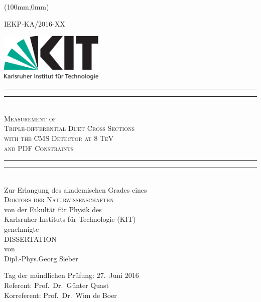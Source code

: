 \begin{titlepage}
    \begin{center}
        \begin{textblock*}{5cm}(100mm,0mm)
            \begin{flushright}
                \small
                IEKP-KA/2016-XX
            \end{flushright}
        \end{textblock*}
        \includegraphics[width=5.0cm]{figures/Kitlogo_de_cmyk}
        \vspace*{2cm}

        \vspace*{\baselineskip}
        \rule{\textwidth}{1.6pt}\vspace*{-\baselineskip}\vspace*{2pt}
        \rule{\textwidth}{0.4pt}\\[\baselineskip]
        \LARGE{\textsc{Measurement of\\
            Triple-differential Dijet Cross Sections\\
            with the CMS Detector at 8 TeV\\
            and PDF Constraints}}\\
        \rule{\textwidth}{0.4pt}\vspace*{-\baselineskip}\vspace{3.2pt}
        \rule{\textwidth}{1.6pt}\\[\baselineskip]
        \vspace{6ex}
        \large Zur Erlangung des akademischen Grades eines\\[2.5ex]
        \textsc{Doktors der Naturwissenschaften}\\[2.5ex]
            von der Fakult\"at f\"ur Physik des\\
        Karlsruher Instituts f\"ur Technologie (KIT)\\ 
        genehmigte\\
        \vspace{2.5ex}
        DISSERTATION\\
        \vspace{2.5ex}
        von\\
        \vspace{2ex}
        Dipl.-Phys.\;Georg Sieber\\

    \end{center}
\vspace{\fill}
Tag der mündlichen Prüfung: 27.\ Juni 2016\\[1.5ex]
Referent: Prof.\ Dr.\ Günter Quast\\[0.5ex]
Korreferent: Prof.\ Dr.\ Wim de Boer

\end{titlepage}
\cleardoublepage
